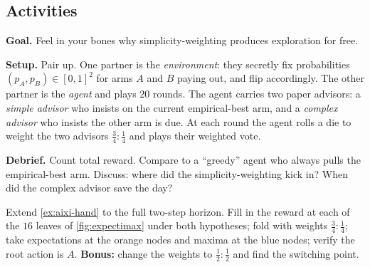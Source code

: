 \documentclass[12pt,a4paper]{article}
\theoremstyle{plain}
\theoremstyle{definition}
\begin{document}
\subsection*{Activities}

\begin{activity}[title={Activity A: Two-armed bandit, live in the room}]
\textbf{Goal.}  Feel in your bones why simplicity-weighting produces
exploration for free.

\textbf{Setup.}  Pair up.  One partner is the \emph{environment}: they
secretly fix probabilities $(p_A, p_B)\in[0,1]^2$ for arms $A$ and $B$
paying out, and flip accordingly.  The other partner is the
\emph{agent} and plays $20$ rounds.  The agent carries two paper
advisors: a \emph{simple advisor} who insists on the current
empirical-best arm, and a \emph{complex advisor} who insists the other
arm is due.  At each round the agent rolls a die to weight the two
advisors $\tfrac{3}{4} : \tfrac{1}{4}$ and plays their weighted vote.

\textbf{Debrief.}  Count total reward.  Compare to a ``greedy'' agent
who always pulls the empirical-best arm.  Discuss: where did the
simplicity-weighting kick in?  When did the complex advisor save the
day?
\end{activity}

\begin{activity}[title={Activity B: Hand-compute AIXI (worksheet)}]
Extend \cref{ex:aixi-hand} to the full two-step horizon.  Fill in the
reward at each of the $16$ leaves of \cref{fig:expectimax} under both
hypotheses; fold with weights $\tfrac{3}{4}:\tfrac{1}{4}$; take
expectations at the orange nodes and maxima at the blue nodes; verify
the root action is $A$.  \textbf{Bonus:} change the weights to
$\tfrac{1}{2}:\tfrac{1}{2}$ and find the switching point.
\end{activity}
\end{document}
